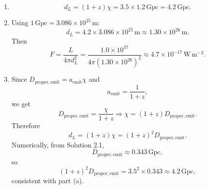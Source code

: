 \begin{enumerate}[label=(\alph*)]
  \item
  \[
    d_L=(1+z)\chi = 3.5\times 1.2\,\mathrm{Gpc}=4.2\,\mathrm{Gpc}.
  \]

  \item Using $1\,\mathrm{Gpc}=3.086\times10^{25}\,\mathrm{m}$:
  \[
    d_L=4.2\times 3.086\times10^{25}\,\mathrm{m}
    \approx 1.30\times10^{26}\,\mathrm{m}.
  \]
  Then
  \[
    F=\frac{L}{4\pi d_L^2}
    =\frac{1.0\times10^{37}}{4\pi(1.30\times10^{26})^2}
    \approx 4.7\times10^{-17}\,\mathrm{W\,m^{-2}}.
  \]

  \item Since $D_{\mathrm{proper,emit}}=a_{\mathrm{emit}}\chi$ and
  \[
    a_{\mathrm{emit}}=\frac{1}{1+z},
  \]
  we get
  \[
    D_{\mathrm{proper,emit}}=\frac{\chi}{1+z}
    \Rightarrow
    \chi=(1+z)D_{\mathrm{proper,emit}}.
  \]
  Therefore
  \[
    d_L=(1+z)\chi=(1+z)^2D_{\mathrm{proper,emit}}.
  \]
  Numerically, from Solution 2.1,
  \[
    D_{\mathrm{proper,emit}}\approx 0.343\,\mathrm{Gpc},
  \]
  so
  \[
    (1+z)^2D_{\mathrm{proper,emit}}=3.5^2\times0.343\approx 4.2\,\mathrm{Gpc},
  \]
  consistent with part (a).
\end{enumerate}



